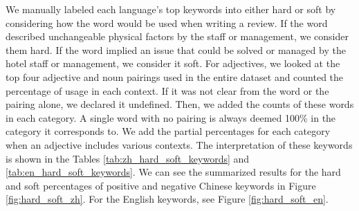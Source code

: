 \documentclass[smallextended,natbib]{svjour3}       %
\begin{document}
    We manually labeled each language's top keywords into either hard or soft by considering how the word would be used when writing a review. If the word described unchangeable physical factors by the staff or management, we consider them hard. If the word implied an issue that could be solved or managed by the hotel staff or management, we consider it soft. For adjectives, we looked at the top four adjective and noun pairings used in the entire dataset and counted the percentage of usage in each context. If it was not clear from the word or the pairing alone, we declared it undefined. Then, we added the counts of these words in each category. A single word with no pairing is always deemed 100\% in the category it corresponds to. We add the partial percentages for each category when an adjective includes various contexts. The interpretation of these keywords is shown in the Tables \ref{tab:zh_hard_soft_keywords} and \ref{tab:en_hard_soft_keywords}. We can see the summarized results for the hard and soft percentages of positive and negative Chinese keywords in Figure \ref{fig:hard_soft_zh}. For the English keywords, see Figure \ref{fig:hard_soft_en}.
\end{document}
